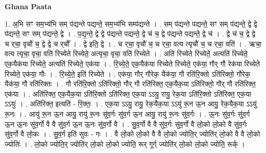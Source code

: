 \documentclass[17pt]{extarticle}
\begin{document}
\textbf{Ghana Paata } \newline

1. अ॒भि सꣳ सम॒भ्य॑भि सम् प॑द्यन्ते पद्यन्ते॒ सम॒भ्य॑भि सम्प॑द्यन्ते । . सम् प॑द्यन्ते पद्यन्ते॒ सꣳ सम् प॑द्यन्ते॒ द्वे द्वे प॑द्यन्ते॒ सꣳ सम् प॑द्यन्ते॒ द्वे । . प॒द्य॒न्ते॒ द्वे द्वे प॑द्यन्ते पद्यन्ते॒ द्वे च॑ च॒ द्वे प॑द्यन्ते पद्यन्ते॒ द्वे च॑ । . द्वे च॑ च॒ द्वे द्वे च र्‌चा॒ वृचौ॑ च॒ द्वे द्वे च र्‌चौ᳚ । . द्वे इति॒ द्वे । . च र्‌चा॒ वृचौ॑ च॒ च र्‌चा॒ वत्य त्यृचौ॑ च॒ च र्‌चा॒ वति॑ । . ऋचा॒ वत्य त्यृचा॒ वृचा॒ वति॑ रिच्येते रिच्येते॒ अत्यृचा॒ वृचा॒ वति॑ रिच्येते । . अति॑ रिच्येते रिच्येते॒ अत्यति॑ रिच्येते॒ एक॒यैक॑या रिच्येते॒ अत्यति॑ रिच्येते॒ एक॑या । . रि॒च्ये॒ते॒ एक॒यैक॑या रिच्येते रिच्येते॒ एक॑या॒ गौर् गौ रेक॑या रिच्येते रिच्येते॒ एक॑या॒ गौः । . रि॒च्ये॒ते॒ इति॑ रिच्येते । . एक॑या॒ गौर् गौरेक॒ यैक॑या॒ गौ रति॑रि॒क्तो ऽति॑रिक्तो॒ गौरेक॒ यैक॑या॒ गौ रति॑रिक्तः । . गौ रति॑रि॒क्तो ऽति॑रिक्तो॒ गौर् गौ रति॑रिक्त॒ एक॒यैक॒या ऽति॑रिक्तो॒ गौर् गौ रति॑रिक्त॒ एक॑या । . अति॑रिक्त॒ एक॒यैक॒या ऽति॑रि॒क्तो ऽति॑रिक्त॒ एक॒या ऽऽयु॒ रायु॒ रेक॒या ऽति॑रि॒क्तो ऽति॑रिक्त॒ एक॒या ऽऽयुः॑ । . अति॑रिक्त॒ इत्यति॑ - रि॒क्तः॒ । . एक॒या ऽऽयु॒ रायु॒ रेक॒यैक॒या ऽऽयु॑ रू॒न ऊ॒न आयु॒ रेक॒यैक॒या ऽऽयु॑ रू॒नः । . आयु॑ रू॒न ऊ॒न आयु॒ रायु॑ रू॒नः सु॑व॒र्गः सु॑व॒र्ग ऊ॒न आयु॒ रायु॑ रू॒नः सु॑व॒र्गः । . ऊ॒नः सु॑व॒र्गः सु॑व॒र्ग ऊ॒न ऊ॒नः सु॑व॒र्गो वै वै सु॑व॒र्ग ऊ॒न ऊ॒नः सु॑व॒र्गो वै । . सु॒व॒र्गो वै वै सु॑व॒र्गः सु॑व॒र्गो वै लो॒को लो॒को वै सु॑व॒र्गः सु॑व॒र्गो वै लो॒कः । . सु॒व॒र्ग इति॑ सुवः - गः । . वै लो॒को लो॒को वै वै लो॒को ज्योति॒र् ज्योति॑र् लो॒को वै वै लो॒को ज्योतिः॑ । . लो॒को ज्योति॒र् ज्योति॑र् लो॒को लो॒को ज्योति॒ रूर् गूर्ग् ज्योति॑र् लो॒को लो॒को ज्योति॒ रूर्क् । \newline
\end{document}
